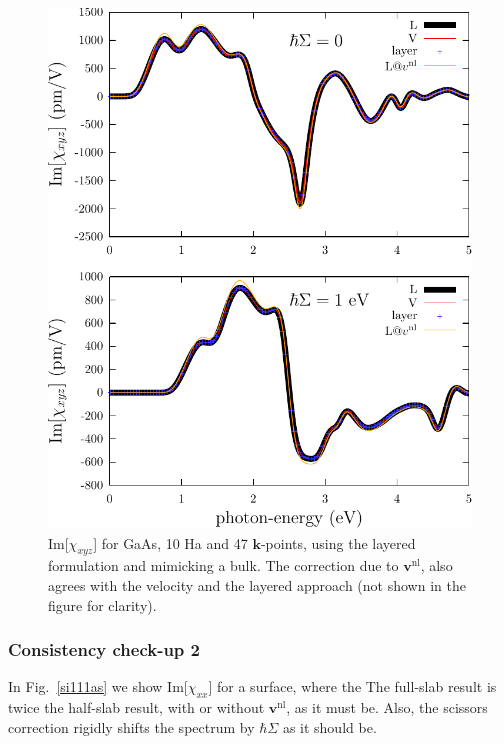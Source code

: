 \begin{figure}[b]
\centering
\includegraphics[scale=.7]{content/figures/appendices/shg-bulk}
\caption{Im[$\chi_{xyz}$] for GaAs, 10 Ha and 47 $\mathbf{k}$-points, using the
layered formulation and mimicking a bulk. The correction due to
$\mathbf{v}^\mathrm{nl}$, also agrees with the velocity and the layered approach
(not shown in the figure for clarity).}
\label{gaas}
\end{figure}


\subsubsection{Consistency check-up 2}

In Fig.~\ref{si111as} we show
Im[$\chi_{xx}$] for a surface, where the 
The full-slab result is twice the half-slab
result, with or without $\mathbf{v}^\mathrm{nl}$,  as it must be. Also, the scissors
correction rigidly shifts the spectrum by $\hbar\Sigma$ as it should be.  

